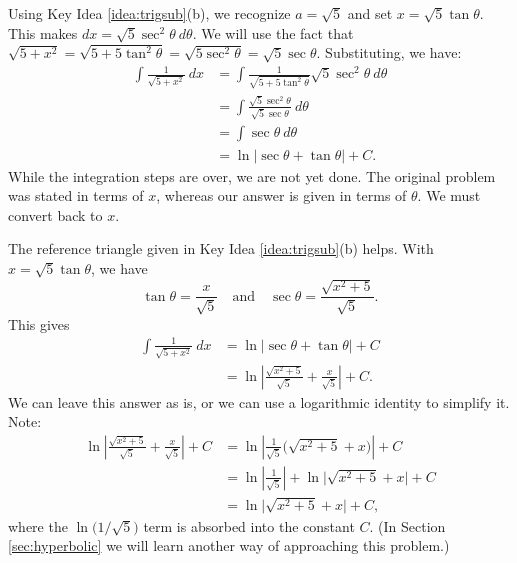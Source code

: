 {Using Key Idea \ref{idea:trigsub}(b), we recognize $a=\sqrt{5}$ and  set $x= \sqrt{5}\tan \theta$. This makes $dx = \sqrt{5}\sec^2\theta\ d\theta$. We will use the fact that $\sqrt{5+x^2} = \sqrt{5+5\tan^2\theta} = \sqrt{5\sec^2\theta} = \sqrt{5}\sec\theta.$ Substituting, we have:
\begin{align*}
\int \frac{1}{\sqrt{5+x^2}}\ dx &= \int \frac{1}{\sqrt{5+5\tan^2\theta}}\sqrt{5}\sec^2\theta\ d\theta \\
			&= \int \frac{\sqrt{5}\sec^2\theta}{\sqrt{5}\sec\theta} \ d\theta\\
			&= \int \sec\theta\ d\theta\\
			&= \ln\big|\sec\theta+\tan\theta\big|+C.
\end{align*}
While the integration steps are over, we are not yet done. The original problem was stated in terms of $x$, whereas our answer is given in terms of $\theta$. We must convert back to $x$.

The reference triangle given in Key Idea \ref{idea:trigsub}(b) helps. With $x=\sqrt{5}\tan\theta$, we have 
\[
\tan \theta = \frac x{\sqrt{5}}\quad \text{and}\quad \sec\theta = \frac{\sqrt{x^2+5}}{\sqrt{5}}.
\]
This gives
\begin{align*}
\int \frac{1}{\sqrt{5+x^2}}\ dx &= \ln\big|\sec\theta+\tan\theta\big|+C \\
     &= \ln\left|\frac{\sqrt{x^2+5}}{\sqrt{5}}+ \frac x{\sqrt{5}}\right|+C.
\end{align*}
We can leave this answer as is, or we can use a logarithmic identity to simplify it. Note:
\begin{align*}
\ln\left|\frac{\sqrt{x^2+5}}{\sqrt{5}}+ \frac x{\sqrt{5}}\right|+C &= \ln\left|\frac{1}{\sqrt{5}}\big(\sqrt{x^2+5}+ x\big)\right|+C \\
   &= \ln\left|\frac{1}{\sqrt{5}}\right| + \ln\big|\sqrt{x^2+5}+ x\big|+C\\
	&=	\ln\big|\sqrt{x^2+5}+ x\big|+C,
\end{align*}
where the $\ln\big(1/\sqrt{5}\big)$ term is absorbed into the constant $C$. (In Section \ref{sec:hyperbolic} we will learn another way of approaching this problem.)
}\\

